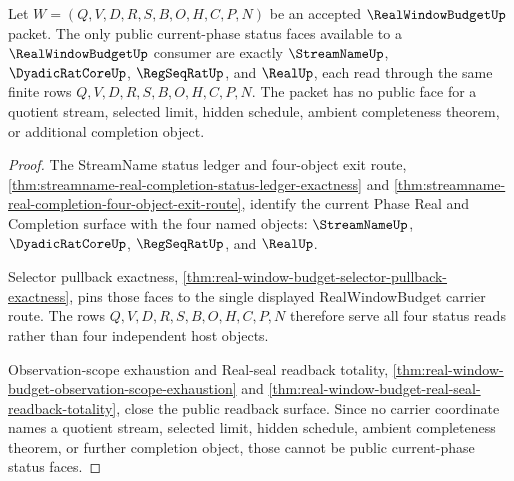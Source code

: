 \begin{theorem}
\label{thm:real-window-budget-four-object-readback-lock}
Let $W=(Q,V,D,R,S,B,O,H,C,P,N)$ be an accepted $\RealWindowBudgetUp$ packet.
The only public current-phase status faces available to a $\RealWindowBudgetUp$
consumer are exactly $\StreamNameUp$, $\DyadicRatCoreUp$, $\RegSeqRatUp$, and
$\RealUp$, each read through the same finite rows $Q,V,D,R,S,B,O,H,C,P,N$.
The packet has no public face for a quotient stream, selected limit, hidden
schedule, ambient completeness theorem, or additional completion object.
\end{theorem}
\begin{proof}
The StreamName status ledger and four-object exit route,
\autoref{thm:streamname-real-completion-status-ledger-exactness} and
\autoref{thm:streamname-real-completion-four-object-exit-route}, identify the
current Phase Real and Completion surface with the four named objects:
$\StreamNameUp$, $\DyadicRatCoreUp$, $\RegSeqRatUp$, and $\RealUp$.

Selector pullback exactness,
\autoref{thm:real-window-budget-selector-pullback-exactness}, pins those faces
to the single displayed RealWindowBudget carrier route. The rows
$Q,V,D,R,S,B,O,H,C,P,N$ therefore serve all four status reads rather than four
independent host objects.

Observation-scope exhaustion and Real-seal readback totality,
\autoref{thm:real-window-budget-observation-scope-exhaustion} and
\autoref{thm:real-window-budget-real-seal-readback-totality}, close the public
readback surface. Since no carrier coordinate names a quotient stream,
selected limit, hidden schedule, ambient completeness theorem, or further
completion object, those cannot be public current-phase status faces.
\end{proof}

